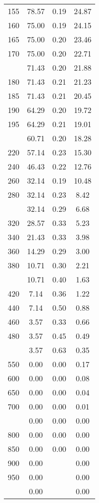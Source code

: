 \begin{table}[ht]
\begin{tabular}{lccc}
  155 & 78.57 & 0.19 & 24.87 \\ 
  160 & 75.00 & 0.19 & 24.15 \\ 
  165 & 75.00 & 0.20 & 23.46 \\ 
  170 & 75.00 & 0.20 & 22.71 \\ 
   \addlinespace
175 & 71.43 & 0.20 & 21.88 \\ 
  180 & 71.43 & 0.21 & 21.23 \\ 
  185 & 71.43 & 0.21 & 20.45 \\ 
  190 & 64.29 & 0.20 & 19.72 \\ 
  195 & 64.29 & 0.21 & 19.01 \\ 
   \addlinespace
200 & 60.71 & 0.20 & 18.28 \\ 
  220 & 57.14 & 0.23 & 15.30 \\ 
  240 & 46.43 & 0.22 & 12.76 \\ 
  260 & 32.14 & 0.19 & 10.48 \\ 
  280 & 32.14 & 0.23 & 8.42 \\ 
   \addlinespace
300 & 32.14 & 0.29 & 6.68 \\ 
  320 & 28.57 & 0.33 & 5.23 \\ 
  340 & 21.43 & 0.33 & 3.98 \\ 
  360 & 14.29 & 0.29 & 3.00 \\ 
  380 & 10.71 & 0.30 & 2.21 \\ 
   \addlinespace
400 & 10.71 & 0.40 & 1.63 \\ 
  420 & 7.14 & 0.36 & 1.22 \\ 
  440 & 7.14 & 0.50 & 0.88 \\ 
  460 & 3.57 & 0.33 & 0.66 \\ 
  480 & 3.57 & 0.45 & 0.49 \\ 
   \addlinespace
500 & 3.57 & 0.63 & 0.35 \\ 
  550 & 0.00 & 0.00 & 0.17 \\ 
  600 & 0.00 & 0.00 & 0.08 \\ 
  650 & 0.00 & 0.00 & 0.04 \\ 
  700 & 0.00 & 0.00 & 0.01 \\ 
   \addlinespace
750 & 0.00 & 0.00 & 0.00 \\ 
  800 & 0.00 & 0.00 & 0.00 \\ 
  850 & 0.00 & 0.00 & 0.00 \\ 
  900 & 0.00 &  & 0.00 \\ 
  950 & 0.00 &  & 0.00 \\ 
   \addlinespace
1000 & 0.00 &  & 0.00 \\ 
   \bottomrule
\end{tabular}
\end{table}
